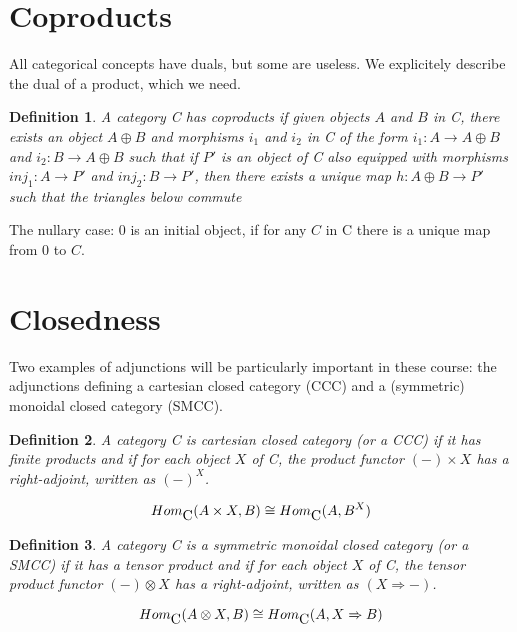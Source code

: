 \documentclass{article}
\newtheorem{definition}{Definition}
\begin{document}
\section{Coproducts}
All categorical concepts have duals, but some are useless. 
We explicitely describe the dual
of a product, which we need.

\begin{definition} A category  C has
coproducts  if given 
objects $A$ and  $B$ in C,
there exists an object $A\oplus B$  and morphisms
$i_1$ and  $i_2$ in C of the form  $i_1\colon A\to A\oplus B$ and
$i_2\colon  B\to A\oplus B$ such that
if $P'$ is an object of C also equipped with morphisms
$inj_1\colon A\to P'$ and  $inj_2\colon B\to P'$, then there exists a
unique map
$h\colon A\oplus B\to P'$ such that the triangles below commute

\begin{center}
\end{center}
\end{definition}

The  nullary case: 0 is an initial object, if for any $C$ in C
there is a unique map from 0 to $C$.


\section{Closedness} 
Two examples of adjunctions will be particularly important in these
course: the adjunctions defining a
cartesian closed category (CCC) and a (symmetric) monoidal closed
category (SMCC).

\begin{definition} A category  C is
cartesian closed category  (or a CCC)
if it has finite products
and if for each object  $X$ of C, 
the product functor
 $(-)\times X$
has a right-adjoint, written as  $(-)^{X}$.

$$Hom_{\mbox C}(A\times X,B)\cong Hom_{\mbox C}(A,B^X)$$
\end{definition}
 
\begin{definition}
A category   C is a symmetric monoidal closed category
 (or a SMCC)
if it has a tensor product and
if for each object  $X$ of  C, the tensor product functor
 $(-)\otimes X$
has a right-adjoint, written as $(X\Rightarrow -)$.

$$Hom_{\mbox C}(A\otimes X,B)\cong Hom_{\mbox C}(A,X\Rightarrow B)$$
\end{definition}
\end{document}
